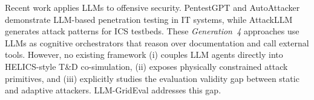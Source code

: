 Recent work applies LLMs to offensive security. PentestGPT \cite{deng2024pentestgpt} and AutoAttacker \cite{autoattacker} demonstrate LLM-based penetration testing in IT systems, while AttackLLM \cite{attackllm} generates attack patterns for ICS testbeds. These \emph{Generation~4} approaches use LLMs as cognitive orchestrators that reason over documentation and call external tools. However, no existing framework (i) couples LLM agents directly into HELICS-style T\&D co-simulation, (ii) exposes physically constrained attack primitives, and (iii) explicitly studies the evaluation validity gap between static and adaptive attackers. LLM-GridEval addresses this gap.